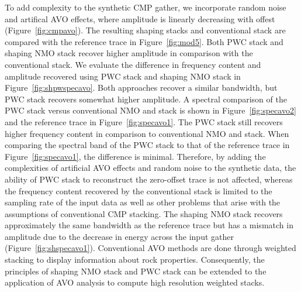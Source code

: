 To add complexity to the synthetic CMP gather, we incorporate random noise and artifical AVO effects, where amplitude
is linearly decreasing with offest (Figure~\ref{fig:cmpavo}). The resulting shaping stacks and conventional stack are 
compared with the reference trace in Figure~\ref{fig:mod5}. Both PWC stack and shaping NMO stack recover higher amplitude 
in comparison with the conventional stack. We evaluate the difference in frequency content and amplitude recovered using 
PWC stack and shaping NMO stack in Figure~\ref{fig:shpwspecavo}. Both approaches recover a similar bandwidth, but PWC
stack recovers somewhat higher amplitude. A spectral comparison of the PWC stack versus conventional 
NMO and stack is shown in Figure~\ref{fig:specavo2} and the reference trace in Figure~\ref{fig:specavo1}.
The PWC stack still recovers higher frequency content in comparison
to conventional NMO and stack. When comparing the spectral band of the PWC stack to that of the reference trace 
in Figure~\ref{fig:specavo1}, the difference is minimal. Therefore, by adding the complexities of
artificial AVO effects and random noise to the synthetic data, the ability of PWC stack to reconstruct the 
zero-offset trace is not affected, whereas the frequency content recovered by the conventional stack is 
limited to the sampling rate of the input data as well as other problems that arise with the assumptions of 
conventional CMP stacking. The shaping NMO stack recovers approximately the same bandwidth as the reference 
trace but has a mismatch in amplitude due to the decrease in energy across the input gather (Figure~\ref{fig:shspecavo1}).
Conventional AVO methods are done through weighted 
stacking \cite[]{smith} to display information about rock properties. Consequently, the principles of shaping NMO stack 
and PWC stack can be extended to the application of AVO analysis to compute high resolution weighted stacks.  





